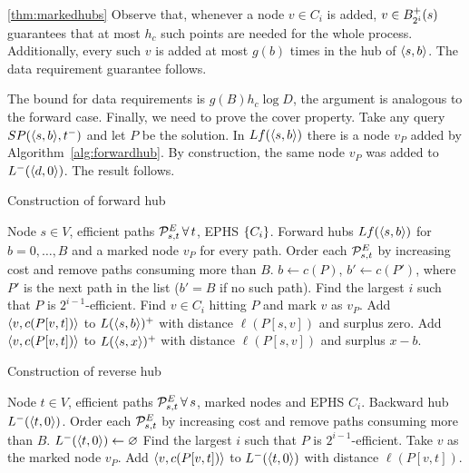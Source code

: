 \documentclass[opre,nonblindrev]{informs3} %
\begin{document}
\begin{APPENDICES}
\begin{proofof}{\cref{thm:markedhubs}}
	Observe that, whenever a node $v\in C_i$ is added, $v\in \Bf_{2^i}(s)$ guarantees that at most $h_c$ such points are needed for the whole process.
	Additionally, every such $v$ is added at most $g(b)$ times in the hub of $\pp{s,b}$.
	The data requirement guarantee follows.
	
	The bound for data requirements is $g(B) h_c\log D$, the argument is analogous to the forward case.
	Finally, we need to prove the cover property.
	Take any query $SP(\pp{s,b},t^-)$ and let $P$ be the solution.
	In $Lf(\pp{s,b})$ there is a node $v_P$ added by Algorithm~\ref{alg:forwardhub}.
	By construction, the same node $v_P$ was added to $\Lb(\pp{d,0})$. The result follows.
\end{proofof}

\begin{algorithm}
	\small
	\caption{Construction of forward hub}
	\label{alg:forwardhub}
	\begin{algorithmic}[1]
		\Require Node $s\in V$, efficient paths $\PE_{s,t}\,\forall\,t$, EPHS $\crl*{C_i}$.
		\Ensure Forward hubs $Lf(\pp{s,b})$ for $b=0,\ldots,B$ and a marked node $v_P$ for every path.
		\State Order each $\PE_{s,t}$ by increasing cost and remove paths consuming more than $B$.
		\State $b\gets c(P)$, $b'\gets c(P')$, where $P'$ is the next path in the list ($b'=B$ if no such path).
		\State Find the largest $i$ such that $P$ is $2^{i-1}$-efficient.
		\State Find $v\in C_i$ hitting $P$ and mark $v$ as $v_P$.
		\State Add $\pp{v,c(P[v,t])}$ to $L(\pp{s,b})^+$  with distance $\ell(P[s,v])$ and surplus zero.
		\State Add $\pp{v,c(P[v,t])}$ to $L(\pp{s,x})^+$  with distance $\ell(P[s,v])$ and surplus $x-b$.
		\EndFor
		\EndFor
		\EndFor
	\end{algorithmic}
\end{algorithm}

\begin{algorithm}
	\small
	\caption{Construction of reverse hub}
	\label{alg:reversehub}
	\begin{algorithmic}[1]
		\Require Node $t\in V$, efficient paths $\Pst^E\,\forall\,s$, marked nodes and EPHS $C_i$.
		\Ensure Backward hub $\Lb(\pp{t,0})$.
		\State Order each $\Pst^E$ by increasing cost and remove paths consuming more than $B$.
		\State $\Lb(\pp{t,0})\gets \varnothing$
		\State Find the largest $i$ such that $P$ is $2^{i-1}$-efficient.
		\State Take $v$ as the marked node $v_P$.
		\State Add $\pp{v,c(P[v,t])}$ to $\Lb(\pp{t,0})$ with distance $\ell(P[v,t])$.
		\EndFor
		\EndFor
	\end{algorithmic}
\end{algorithm}



\end{APPENDICES}
\end{document}
